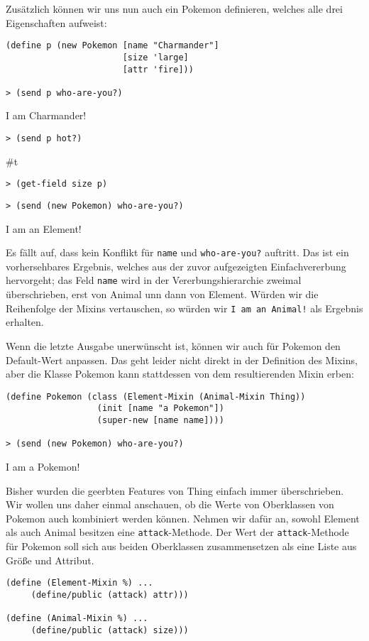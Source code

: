 Zusätzlich können wir uns nun auch ein Pokemon definieren, welches alle drei Eigenschaften aufweist:
\begin{lstlisting}
(define p (new Pokemon [name "Charmander"]
                       [size 'large]
                       [attr 'fire]))
 
> (send p who-are-you?)
\end{lstlisting}
{\routput {\qq}I am Charmander!\qq}
\begin{lstlisting}
> (send p hot?)
\end{lstlisting}
{\routput \#t}
\begin{lstlisting}
> (get-field size p)
\end{lstlisting}
{}
\begin{lstlisting}
> (send (new Pokemon) who-are-you?)
\end{lstlisting}
{\routput {\qq}I am an Element!\qq}

Es fällt auf, dass kein Konflikt für \texttt{name} und \texttt{who-are-you?} auftritt. Das ist ein vorhersehbares Ergebnis, welches aus der zuvor aufgezeigten Einfachvererbung hervorgeht; das Feld \texttt{name} wird in der Vererbungshierarchie zweimal überschrieben, erst von Animal unn dann von Element. Würden wir die Reihenfolge der Mixins vertauschen, so würden wir \texttt{{\qq}I am an Animal!\qq} als Ergebnis erhalten.

Wenn die letzte Ausgabe unerwünscht ist, können wir auch für Pokemon den Default-Wert anpassen. Das geht leider nicht direkt in der Definition des Mixins, aber die Klasse Pokemon kann stattdessen von dem resultierenden Mixin erben:

\begin{lstlisting}
(define Pokemon (class (Element-Mixin (Animal-Mixin Thing))
                  (init [name "a Pokemon"])
                  (super-new [name name])))
     
> (send (new Pokemon) who-are-you?)
\end{lstlisting}
{\routput {\qq}I am a Pokemon!\qq}

Bisher wurden die geerbten Features von Thing einfach immer überschrieben. Wir wollen uns daher einmal anschauen, ob die Werte von Oberklassen von Pokemon auch kombiniert werden können. Nehmen wir dafür an, sowohl Element als auch Animal besitzen eine \texttt{attack}-Methode. Der Wert der \texttt{attack}-Methode für Pokemon soll sich aus beiden Oberklassen zusammensetzen als eine Liste aus Größe und Attribut.

\begin{lstlisting}
(define (Element-Mixin %) ...
     (define/public (attack) attr)))

(define (Animal-Mixin %) ...
     (define/public (attack) size)))
\end{lstlisting}

